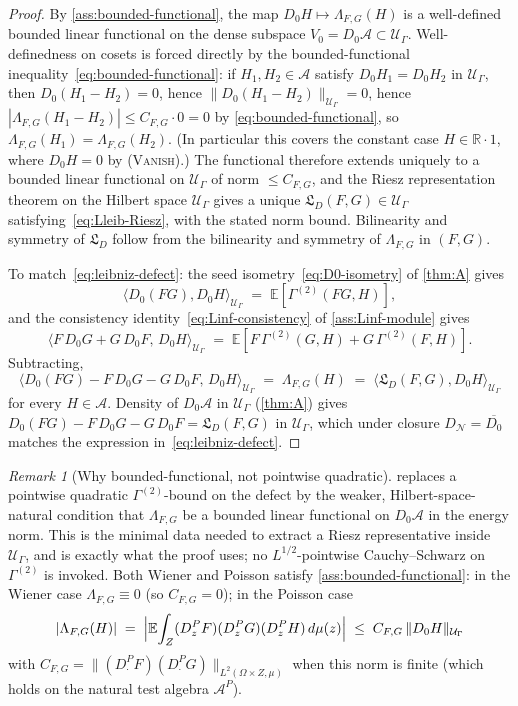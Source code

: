 \documentclass[11pt,reqno]{amsart}
\theoremstyle{plain}
\theoremstyle{definition}
\theoremstyle{remark}
\newtheorem{remark}[theorem]{Remark}
\newcommand{\R}{\mathbb{R}}
\newcommand{\E}{\mathbb{E}}
\newcommand{\cA}{\mathcal A}
\newcommand{\cN}{\mathcal N}
\newcommand{\cU}{\mathcal U}
\newcommand{\dN}{D_{\cN}}
\newcommand{\Lleib}{\mathfrak L}
\begin{document}
\begin{proof}
By \cref{ass:bounded-functional}, the map
$D_{0}H\mapsto\Lambda_{F,G}(H)$ is a well-defined bounded linear
functional on the dense subspace $V_{0}=D_{0}\cA\subset\cU_{\Gamma}$.
Well-definedness on cosets is forced directly by the
bounded-functional inequality~\eqref{eq:bounded-functional}: if
$H_{1},H_{2}\in\cA$ satisfy $D_{0}H_{1}=D_{0}H_{2}$ in
$\cU_{\Gamma}$, then $D_{0}(H_{1}-H_{2})=0$, hence
$\|D_{0}(H_{1}-H_{2})\|_{\cU_{\Gamma}}=0$, hence
$|\Lambda_{F,G}(H_{1}-H_{2})|\le C_{F,G}\cdot 0=0$ by
\eqref{eq:bounded-functional}, so
$\Lambda_{F,G}(H_{1})=\Lambda_{F,G}(H_{2})$. (In particular this
covers the constant case $H\in\R\cdot 1$, where
$D_{0}H=0$ by \textsc{(Vanish)}.) The functional therefore
extends uniquely to a bounded linear functional on $\cU_{\Gamma}$
of norm $\le C_{F,G}$, and the Riesz representation theorem on
the Hilbert space $\cU_{\Gamma}$ gives a unique
$\Lleib_{D}(F,G)\in\cU_{\Gamma}$
satisfying~\eqref{eq:Lleib-Riesz}, with the stated norm bound.
Bilinearity and symmetry of $\Lleib_{D}$ follow from the
bilinearity and symmetry of $\Lambda_{F,G}$ in $(F,G)$.

To match~\eqref{eq:leibniz-defect}: the seed
isometry~\eqref{eq:D0-isometry} of \cref{thm:A} gives
\[
  \langle D_{0}(FG),D_{0}H\rangle_{\cU_{\Gamma}}
  \;=\;\E[\Gamma^{(2)}(FG,H)],
\]
and the consistency
identity~\eqref{eq:Linf-consistency} of \cref{ass:Linf-module}
gives
\[
  \langle F\,D_{0}G+G\,D_{0}F,\,D_{0}H\rangle_{\cU_{\Gamma}}
  \;=\;\E[F\,\Gamma^{(2)}(G,H)+G\,\Gamma^{(2)}(F,H)].
\]
Subtracting,
\[
  \langle D_{0}(FG)-F\,D_{0}G-G\,D_{0}F,\,D_{0}H\rangle_{\cU_{\Gamma}}
  \;=\;\Lambda_{F,G}(H)
  \;=\;\langle\Lleib_{D}(F,G),D_{0}H\rangle_{\cU_{\Gamma}}
\]
for every $H\in\cA$. Density of $D_{0}\cA$ in $\cU_{\Gamma}$
(\cref{thm:A}) gives
$D_{0}(FG)-F\,D_{0}G-G\,D_{0}F=\Lleib_{D}(F,G)$ in $\cU_{\Gamma}$,
which under closure $\dN=\overline{D_{0}}$ matches the
expression in~\eqref{eq:leibniz-defect}.
\end{proof}

\begin{remark}[Why bounded-functional, not pointwise quadratic]\label{rem:why-bounded-functional}
 replaces a pointwise quadratic
$\Gamma^{(2)}$-bound on the defect by the weaker, Hilbert-space-natural
condition that $\Lambda_{F,G}$ be a bounded linear functional on
$D_{0}\cA$ in the energy norm. This is the minimal data needed to
extract a Riesz representative inside $\cU_{\Gamma}$, and is exactly
what the proof uses; no $L^{1/2}$-pointwise Cauchy--Schwarz on
$\Gamma^{(2)}$ is invoked. Both Wiener and Poisson satisfy
\cref{ass:bounded-functional}: in the Wiener case
$\Lambda_{F,G}\equiv 0$ (so $C_{F,G}=0$); in the Poisson case
\[
  |\Lambda_{F,G}(H)|
  \;=\;\Bigl|\E\!\int_{Z}(D^{P}_{z}F)(D^{P}_{z}G)(D^{P}_{z}H)\,d\mu(z)\Bigr|
  \;\le\;C_{F,G}\,\|D_{0}H\|_{\cU_{\Gamma}}
\]
with $C_{F,G}=\|(D^{P}_{\cdot}F)(D^{P}_{\cdot}G)\|_{L^{2}(\Omega\times Z,\mu)}$
when this norm is finite (which holds on the natural test
algebra $\cA^{P}$).
\end{remark}
\end{document}
